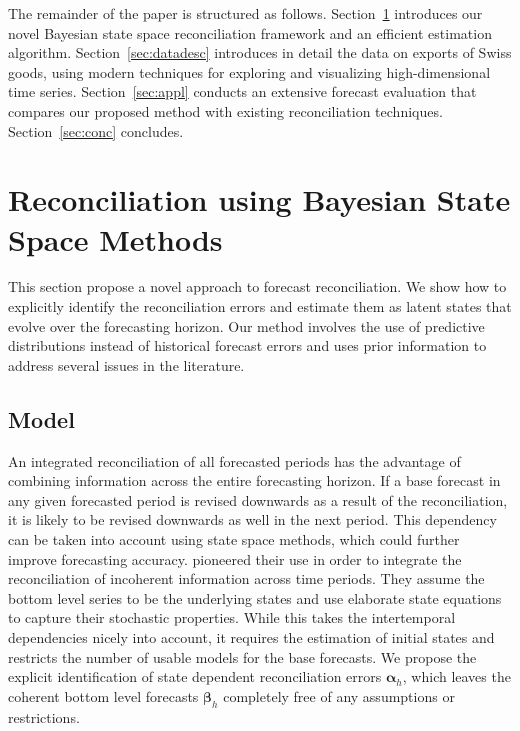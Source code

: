 \documentclass[a4paper,fleqn,11pt]{article}
\begin{document}
The remainder of the paper is structured as follows. Section~\ref{sec:model} introduces our novel Bayesian state space reconciliation framework and an efficient estimation algorithm.  Section~\ref{sec:datadesc} introduces in detail the data on exports of Swiss goods, using modern techniques for exploring and visualizing high-dimensional time series.  Section~\ref{sec:appl} conducts an extensive forecast evaluation that compares our proposed method with existing reconciliation techniques. Section~\ref{sec:conc} concludes.






\section{Reconciliation using Bayesian State Space Methods}\label{sec:model}

This section propose a novel approach to forecast reconciliation. We show how to explicitly identify the reconciliation errors and estimate them as latent states that evolve over the forecasting horizon. Our method involves the use of predictive distributions instead of historical forecast errors and uses prior information to address several issues in the literature. 

\subsection{Model}
An integrated reconciliation of all forecasted periods has the advantage of combining information across the entire forecasting horizon. If a base forecast in any given forecasted period is revised downwards as a result of the reconciliation, it is likely to be revised downwards as well in the next period. This dependency can be taken into account using state space methods, which could further improve forecasting accuracy. \cite{Pennings2017} pioneered their use in order to integrate the reconciliation of incoherent information across time periods. They assume the bottom level series to be the underlying states and use elaborate state equations to capture their stochastic properties. While this takes the intertemporal dependencies nicely into account, it requires the estimation of initial states and restricts the number of usable models for the base forecasts. We propose the explicit identification of state dependent reconciliation errors $\boldsymbol{\alpha}_h$, which leaves the coherent bottom level forecasts $\boldsymbol{\beta}_h$ completely free of any assumptions or restrictions.
\end{document}
